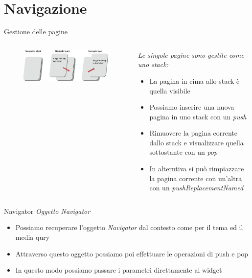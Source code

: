 \documentclass{../libs/presentation_format}
\begin{document}

\section{Navigazione}
\begin{frame}{Gestione delle pagine}
	\begin{minipage}[0.2\textheight]{\textwidth}
		\begin{columns}[T]
			\begin{column}{0.4\textwidth}
				\begin{figure}[htpb]
					\centering
					\includegraphics[scale=0.2]{../libs/navigation-stack}
				\end{figure}
			\end{column}
			\begin{column}{0.6\textwidth}
				\emph{Le singole pagine sono gestite come uno stack:}
				\begin{itemize}
					\item La pagina in cima allo stack è quella visibile
					\item Possiamo inserire una nuova pagina in uno stack con un \emph{push}
					\item Rimuovere la pagina corrente dallo stack e visualizzare quella sottostante con un \emph{pop}
					\item In alterntiva si può rimpiazzare la pagina corrente con un'altra con un \emph{pushReplacementNamed}
				\end{itemize}
			\end{column}
		\end{columns}
	\end{minipage}
\end{frame}


\begin{frame}{Navigator}
	\emph{Oggetto Navigator}
	\begin{itemize}
		\item Possiamo recuperare l'oggetto \emph{Navigator} dal contesto come per il tema ed il media qury
		\item Attraverso questo oggetto possiamo poi effettuare le operazioni di push e pop
		\item In questo modo possiamo passare i parametri direttamente al widget
	\end{itemize}
	\centering
	\href{https://docs.flutter.dev/cookbook/navigation/navigation-basics}{}
\end{frame}
\end{document}
